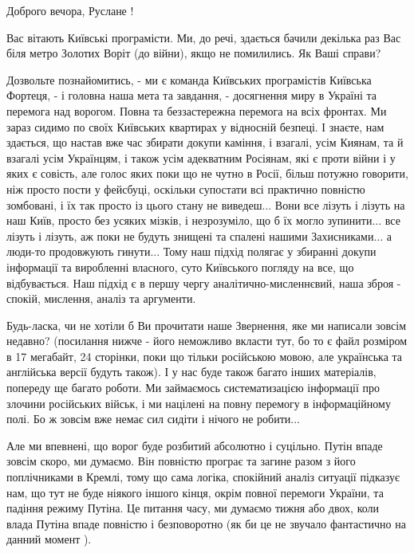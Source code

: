  
 
 
 
 

Доброго вечора, Руслане !

Вас вітають Київські програмісти. Ми, до речі, здається бачили декілька раз Вас
біля метро Золотих Воріт (до війни), якщо не помилились. Як Ваші справи?

Дозвольте познайомитись, - ми є команда Київських програмістів Київська
Фортеця, - і головна наша мета та завдання, - досягнення миру в Україні та
перемога над ворогом.  Повна та беззастережна перемога на всіх фронтах. Ми
зараз сидимо по своїх Київських квартирах у відносній безпеці. І знаєте, нам
здається, що настав вже час збирати докупи каміння, і взагалі, усім Киянам, та
й взагалі усім Українцям, і також усім адекватним Росіянам, які є проти війни і
у яких є совість, але голос яких поки що не чутно в Росії, більш потужно
говорити, ніж просто пости у фейсбуці, оскільки супостати всі практично
повністю зомбовані, і їх так просто із цього стану не виведеш... Вони все
лізуть і лізуть на наш Київ, просто без усяких мізків, і незрозуміло, що б їх могло
зупинити... все лізуть і лізуть, аж поки не будуть знищені та спалені нашими
Захисниками... а люди-то продовжують гинути...  Тому наш підхід полягає у
збиранні докупи інформації та виробленні власного, суто Київського погляду на
все, що відбувається. Наш підхід є в першу чергу аналітично-мисленнєвий, наша
зброя - спокій, мислення, аналіз та аргументи.

Будь-ласка, чи не хотіли б Ви прочитати наше Звернення, яке ми написали зовсім
недавно?  (посилання нижче - його неможливо вкласти тут, бо то є файл розміром
в 17 мегабайт, 24 сторінки, поки що тільки російською мовою, але українська та
англійська версії будуть також). І у нас буде також багато інших матеріалів,
попереду ще багато роботи. Ми займаємось систематизацією інформації про злочини
російських військ, і ми націлені на повну перемогу в інформаційному полі. Бо ж
зовсім вже немає сил сидіти і нічого не робити...

Але ми впевнені, що ворог буде розбитий абсолютно і суцільно. Путін впаде
зовсім скоро, ми думаємо.  Він повністю програє та загине разом з його
поплічниками в Кремлі, тому що сама логіка, спокійний аналіз ситуації підказує
нам, що тут не буде ніякого іншого кінця, окрім повної перемоги України, та
падіння режиму Путіна. Це питання часу, ми думаємо тижня або двох, коли влада
Путіна впаде повністю і безповоротно (як би це не звучало фантастично на данний
момент ).

